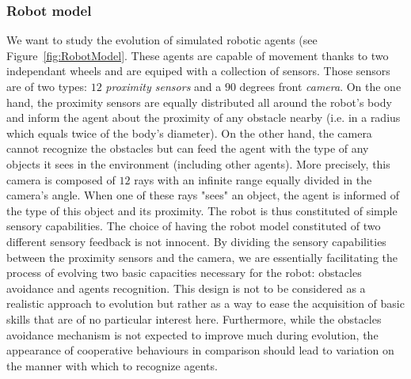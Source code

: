     \subsubsection{Robot model} We want to study the evolution of simulated robotic agents (see Figure~\ref{fig:RobotModel}. These agents are capable of movement thanks to two independant wheels and are equiped with a collection of sensors. Those sensors are of two types: $12$ \emph{proximity sensors} and a $90$ degrees front \emph{camera}. On the one hand, the proximity sensors are equally distributed all around the robot's body and inform the agent about the proximity of any obstacle nearby (i.e. in a radius which equals twice of the body's diameter). On the other hand, the camera cannot recognize the obstacles but can feed the agent with the type of any objects it sees in the environment (including other agents). More precisely, this camera is composed of $12$ rays with an infinite range equally divided in the camera's angle. When one of these rays "sees" an object, the agent is informed of the type of this object and its proximity. The robot is thus constituted of simple sensory capabilities. The choice of having the robot model constituted of two different sensory feedback is not innocent. By dividing the sensory capabilities between the proximity sensors and the camera, we are essentially facilitating the process of evolving two basic capacities necessary for the robot: obstacles avoidance and agents recognition. This design is not to be considered as a realistic approach to evolution but rather as a way to ease the acquisition of basic skills that are of no particular interest here. Furthermore, while the obstacles avoidance mechanism is not expected to improve much during evolution, the appearance of cooperative behaviours in comparison should lead to variation on the manner with which to recognize agents.

